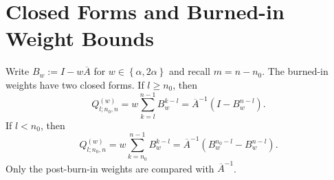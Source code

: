 
\section{Closed Forms and Burned-in Weight Bounds}

Write $B_{w} := I - w \overline{A}$ for $w \in \left\{ \alpha, 2 \alpha \right\}$ and recall
$m = n - n_{0}$. The burned-in weights have two closed forms. If
$l \ge n_{0}$, then
\begin{equation}
Q_{l; n_{0}, n}^{(w)}
  = w \sum_{k = l}^{n - 1} B_{w}^{k - l}
  = \overline{A}^{-1} \left( I - B_{w}^{n - l} \right).
\label{eq:burn-Q-post-form}
\end{equation}
If $l < n_{0}$, then
\begin{equation}
Q_{l; n_{0}, n}^{(w)}
  = w \sum_{k = n_{0}}^{n - 1} B_{w}^{k - l}
  = \overline{A}^{-1} \left( B_{w}^{n_{0} - l} - B_{w}^{n - l} \right).
\label{eq:burn-Q-pre-form}
\end{equation}
Only the post-burn-in weights are compared with $\overline{A}^{-1}$.

